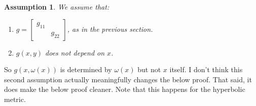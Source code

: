 \documentclass[reqno,12pt,letterpaper]{amsart}
\newtheorem{assumption}[theorem]{Assumption}
\theoremstyle{definition}
\numberwithin{equation}{section}
\begin{document}
\begin{assumption}
We assume that:
\begin{enumerate}
\item $g = \begin{bmatrix}g_{11} \\ & g_{22}\end{bmatrix}$, as in the previous section.
\item $g(x, y)$ does not depend on $x$.
\end{enumerate}
\end{assumption}

So $g(x, \omega(x))$ is determined by $\omega(x)$ but not $x$ itself.
I don't think this second assumption actually meaningfully changes the below proof.
That said, it does make the below proof cleaner.
Note that this happens for the hyperbolic metric.
\end{document}

